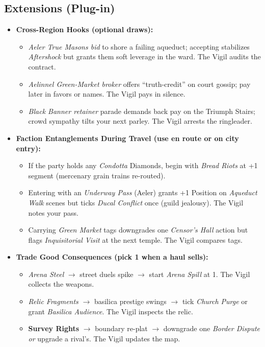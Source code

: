 \subsection*{Extensions (Plug-in)}
\label{sec:ecktoria-extensions}
\begin{itemize}
  \item \textbf{Cross-Region Hooks (optional draws):}
  \begin{itemize}
    \item \emph{Aeler True Masons bid} to shore a failing aqueduct; accepting stabilizes \emph{Aftershock} but grants them soft leverage in the ward. The Vigil audits the contract.
    \item \emph{Aelinnel Green-Market broker} offers ``truth-credit'' on court gossip; pay later in favors or names. The Vigil pays in silence.
    \item \emph{Black Banner retainer} parade demands back pay on the Triumph Stairs; crowd sympathy tilts your next parley. The Vigil arrests the ringleader.
  \end{itemize}

  \item \textbf{Faction Entanglements During Travel (use en route or on city entry):}
  \begin{itemize}
    \item If the party holds any \emph{Condotta} Diamonds, begin with \emph{Bread Riots} at +1 segment (mercenary grain trains re-routed).
    \item Entering with an \emph{Underway Pass} (Aeler) grants +1 Position on \emph{Aqueduct Walk} scenes but ticks \emph{Ducal Conflict} once (guild jealousy). The Vigil notes your pass.
    \item Carrying \emph{Green Market} tags downgrades one \emph{Censor's Hall} action but flags \emph{Inquisitorial Visit} at the next temple. The Vigil compares tags.
  \end{itemize}

  \item \textbf{Trade Good Consequences (pick 1 when a haul sells):}
  \begin{itemize}
    \item \emph{Arena Steel} $\rightarrow$ street duels spike $\rightarrow$ start \emph{Arena Spill} at 1. The Vigil collects the weapons.
    \item \emph{Relic Fragments} $\rightarrow$ basilica prestige swings $\rightarrow$ tick \emph{Church Purge} or grant \emph{Basilica Audience}. The Vigil inspects the relic.
    \item \textbf{Survey Rights} $\rightarrow$ boundary re-plat $\rightarrow$ downgrade one \emph{Border Dispute} \emph{or} upgrade a rival's. The Vigil updates the map.
  \end{itemize}


\end{itemize}
